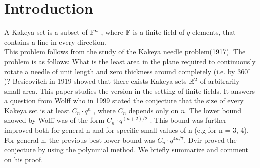 \section{Introduction}
A Kakeya set is a subset of ${\mathbb{F}}^n$ , where ${\mathbb{F}}$ is a finite field of $q$ elements, that contains a line in every direction.
\\
This problem follows from the study of the Kakeya needle problem(1917). The problem is as follows: What is the least area in the plane required to continuously rotate a needle of unit length and zero thickness around completely (i.e. by $360^\circ$)? Besicovitch in 1919 showed that there exists Kakeya sets ${{\mathbb{R}}}^2$ of arbitrarily small area. This paper studies the version in the setting of finite fields. It answers a question from Wolff who in 1999 stated the conjecture that the size of every Kakeya set is at least $C_n \cdot q^n$ , where $C_n$ depends only on $n$. The lower bound showed by Wolff was of the form $C_n \cdot q^{(n+2)/2}$ . This bound was further improved both for general n and for specific small values of n (e.g for n = 3, 4). For general n, the previous best lower bound was $C_n \cdot q^{4n/7}$. Dvir proved the conjecture by using the polynmial method. We briefly summarize and comment on his proof.